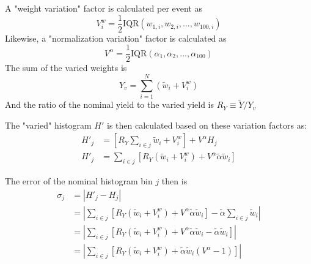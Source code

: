 A "weight variation" factor is calculated per event as 
    \begin{equation}
    V^w_i = \frac{1}{2}\textrm{IQR}(w_{1,i}, w_{2,i}, ..., w_{100,i})
    \end{equation}
Likewise, a "normalization variation" factor is calculated as
    \begin{equation}
    V^{\alpha} = \frac{1}{2}\textrm{IQR}(\alpha_{1}, \alpha_{2}, ..., \alpha_{100})
    \end{equation}
The sum of the varied weights is 
    \begin{equation}
    Y_v = \sum_{i=1}^{N} \left( \tilde w_i + V^w_i \right)
    \end{equation}
And the ratio of the nominal yield to the varied yield is $R_Y \equiv \tilde Y / Y_v$

The "varied" histogram $H'$ is then calculated based on these variation factors as:
    \begin{equation} \begin{split}
    H'_j &= \left[ R_Y \sum_{i \in j} \tilde w_i + V^w_i \right] + V^{\alpha} H_j
    \\H'_j &= \sum_{i \in j} \left[ R_Y \left( \tilde w_i + V^w_i \right)
        + V^{\alpha} \tilde \alpha \tilde w_i \right]
    \end{split} \end{equation}

The error of the nominal histogram bin $j$ then is
    \begin{equation} \begin{split}
    \sigma_j &= | H'_j - H_j |
    \\&= \left| \sum_{i \in j} \left[
        R_Y \left( \tilde w_i + V^w_i \right)
        + V^{\alpha} \tilde \alpha \tilde w_i \right] 
        -\tilde \alpha \sum_{i \in j} \tilde w_i \right|
    \\&= \left| \sum_{i \in j} \left[
        R_Y \left( \tilde w_i + V^w_i \right)
        + V^{\alpha} \tilde \alpha \tilde w_i 
        - \tilde \alpha \tilde w_i
        \right] \right|
    \\&= \left| \sum_{i \in j} \left[
        R_Y \left( \tilde w_i + V^w_i \right) 
        + \tilde \alpha \tilde w_i (V^{\alpha}-1) \right] \right|
    \end{split} \end{equation}


